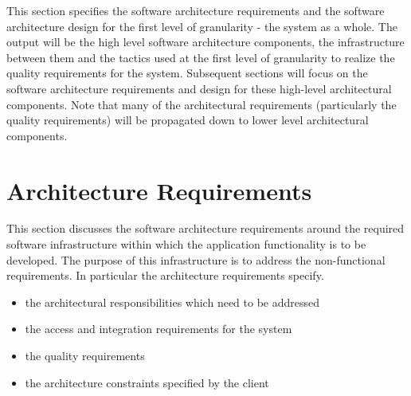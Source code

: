 This section specifies the software architecture requirements and the software architecture design
for the first level of granularity - the system as a whole. The output will be the high level software
architecture components, the infrastructure between them and the tactics used at the first level of
granularity to realize the quality requirements for the system.
Subsequent sections will focus on the software architecture requirements and design for these
high-level architectural components. Note that many of the architectural requirements (particularly
the quality requirements) will be propagated down to lower level architectural components.

\section{Architecture Requirements}
This section discusses the software architecture requirements around the 
required software infrastructure within which the application functionality is
to be developed. The purpose of this infrastructure is to address the
non-functional requirements. In particular the architecture requirements
specify.
\begin{itemize}
	\item the architectural responsibilities which need to be addressed
	\item the access and integration requirements for the system
	\item the quality requirements
	\item the architecture constraints specified by the client
\end{itemize}

